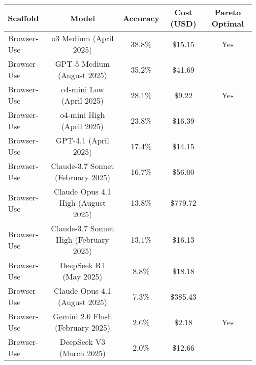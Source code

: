 \begin{tabular}{lcccc}
\toprule
Scaffold & Model & Accuracy & Cost (USD) & Pareto Optimal \\
\midrule
Browser-Use & o3 Medium (April 2025) & 38.8\% & \$15.15 & Yes \\
Browser-Use & GPT-5 Medium (August 2025) & 35.2\% & \$41.69 &  \\
Browser-Use & o4-mini Low (April 2025) & 28.1\% & \$9.22 & Yes \\
Browser-Use & o4-mini High (April 2025) & 23.8\% & \$16.39 &  \\
Browser-Use & GPT-4.1 (April 2025) & 17.4\% & \$14.15 &  \\
Browser-Use & Claude-3.7 Sonnet (February 2025) & 16.7\% & \$56.00 &  \\
Browser-Use & Claude Opus 4.1 High (August 2025) & 13.8\% & \$779.72 &  \\
Browser-Use & Claude-3.7 Sonnet High (February 2025) & 13.1\% & \$16.13 &  \\
Browser-Use & DeepSeek R1 (May 2025) & 8.8\% & \$18.18 &  \\
Browser-Use & Claude Opus 4.1 (August 2025) & 7.3\% & \$385.43 &  \\
Browser-Use & Gemini 2.0 Flash (February 2025) & 2.6\% & \$2.18 & Yes \\
Browser-Use & DeepSeek V3 (March 2025) & 2.0\% & \$12.66 &  \\
\bottomrule
\end{tabular}
